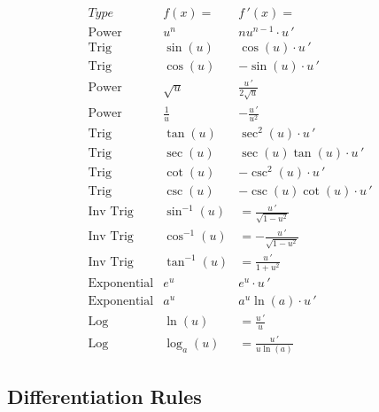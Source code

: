 \documentclass[handout]{ximera}
\begin{document}
\begin{center}
\[
\begin{array}{c|c|c}
		Type & f(x)= & f\,'(x)=  \\
		\hline
		\text{Power} & u^n & nu^{n-1}\cdot u\,'  \\[8pt]
		\hline
		\text{Trig} & \sin\left(u\right) & \cos\left(u\right) \cdot u\,' \\[8pt]
		\text{Trig} & \cos\left(u\right) & -\sin\left(u\right)\cdot u\,'  \\[8pt]
		\hline
		\text{Power} & \sqrt{u} & \displaystyle \frac{u\,' }{2\sqrt {u}}\\[8pt]
		\text{Power} & \displaystyle \frac{1}{u} & -\displaystyle \frac{u\,' }{u^2}\\[8pt]
	  \hline
	  \text{Trig} & \tan\left(u\right) & \sec^2\left(u\right) \cdot u\,'  \\[8pt]
		\text{Trig} & \sec\left(u\right) & \sec\left(u\right)\tan\left(u\right) \cdot u\,'  \\[8pt]
		\hline
		\text{Trig} & \cot\left(u\right) & -\csc^2\left(u\right) \cdot u\,'   \\[8pt]
		\text{Trig} & \csc\left(u\right) & -\csc\left(u\right)\cot\left(u\right) \cdot u\,'   \\[8pt]
		\hline
		\text{Inv Trig} & \sin^{-1}\left(u\right) &  = \displaystyle \frac{u\,' }{\sqrt{1-u^2}}  \\[8pt]
		\text{Inv Trig} & \cos^{-1}\left(u\right) &  = \displaystyle -\frac{u\,' }{\sqrt{1-u^2}}\\[8pt]
		\text{Inv Trig} & \tan^{-1}\left(u\right) &  = \displaystyle \frac{u\,' }{1+u^2} \\[8pt]
		\hline
		\text{Exponential} & e^{u} & e^{u} \cdot u\,' \\[8pt]
		\text{Exponential} & a^{u} & a^{u}\ln(a) \cdot u\,' \\[8pt]
		\hline
		\text{Log} & \ln\left(u\right) &  = \displaystyle \frac{u\,'}{u} \\[8pt]
		\text{Log} & \log_a\left(u\right) &  = \displaystyle \frac{u\,'}{u\ln(a)}
	\end{array}
    \]
\end{center}



\subsection{Differentiation Rules}
\end{document}

